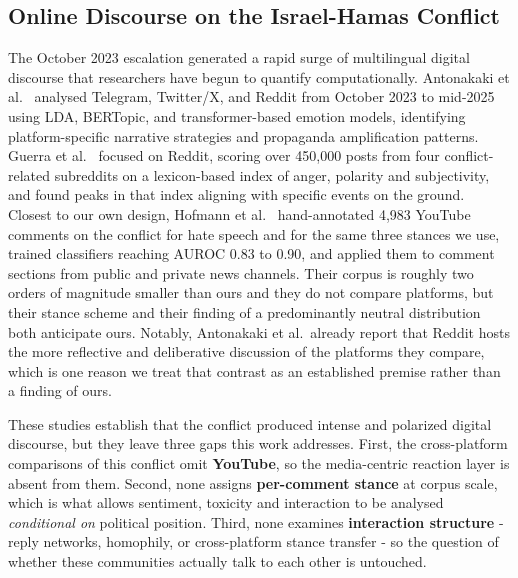 \documentclass[pdflatex,sn-basic,Numbered,iicol]{sn-jnl}
\begin{document}
\subsection{Online Discourse on the Israel-Hamas Conflict}
The October 2023 escalation generated a rapid surge of multilingual digital
discourse that researchers have begun to quantify computationally. Antonakaki
et al.~\cite{antonakaki2025} analysed Telegram, Twitter/X, and Reddit from October
2023 to mid-2025 using LDA, BERTopic, and transformer-based emotion models,
identifying platform-specific narrative strategies and propaganda amplification
patterns. Guerra et al.~\cite{guerra2025} focused on Reddit, scoring over
450{,}000 posts from four conflict-related subreddits on a lexicon-based index of
anger, polarity and subjectivity, and found peaks in that index aligning with
specific events on the ground. Closest
to our own design, Hofmann et al.~\cite{hofmann2026} hand-annotated 4{,}983
YouTube comments on the conflict for hate speech and for the same three stances
we use, trained classifiers reaching AUROC 0.83 to 0.90, and applied them to
comment sections from public and private news channels. Their corpus is roughly
two orders of magnitude smaller than ours and they do not compare platforms, but
their stance scheme and their finding of a predominantly neutral distribution
both anticipate ours. Notably, Antonakaki et al.\ already report that Reddit
hosts the more reflective and deliberative discussion of the platforms they
compare, which is one reason we treat that contrast as an established premise
rather than a finding of ours.

These studies establish that the conflict produced intense and polarized digital
discourse, but they leave three gaps this work addresses. First, the
cross-platform comparisons of this conflict omit \textbf{YouTube}, so the
media-centric reaction layer is absent from them. Second, none assigns
\textbf{per-comment stance} at corpus scale, which is what allows sentiment, toxicity
and interaction to be analysed \emph{conditional on} political position. Third, none
examines \textbf{interaction structure} - reply networks, homophily, or
cross-platform stance transfer - so the question of whether these communities
actually talk to each other is untouched.
\end{document}
